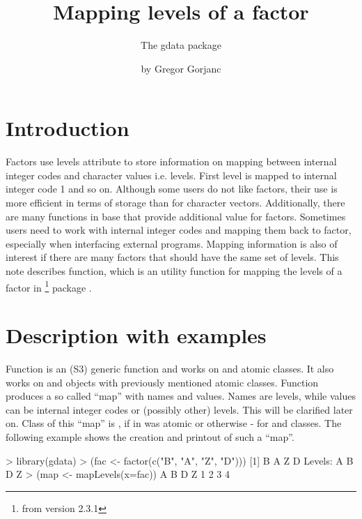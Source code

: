 \documentclass[a4paper]{report}
\begin{document}
\begin{article}

\title{Mapping levels of a factor}
\subtitle{The gdata package}
\author{by Gregor Gorjanc}

\maketitle

\section{Introduction}

Factors use levels attribute to store information on mapping between
internal integer codes and character values i.e. levels. First level is
mapped to internal integer code 1 and so on. Although some users do not
like factors, their use is more efficient in terms of storage than for
character vectors. Additionally, there are many functions in base \R{} that
provide additional value for factors. Sometimes users need to work with
internal integer codes and mapping them back to factor, especially when
interfacing external programs. Mapping information is also of interest if
there are many factors that should have the same set of levels. This note
describes  function, which is an utility function for
mapping the levels of a factor in  \footnote{from version 2.3.1}
package \citep{WarnesGdata}.

\section{Description with examples}

Function  is an (S3) generic function and works on
 and  atomic classes. It also works on
 and  objects with previously mentioned atomic
classes. Function  produces a so called ``map'' with names
and values. Names are levels, while values can be internal integer codes or
(possibly other) levels. This will be clarified later on.  Class of this
``map'' is , if  in  was atomic
or  otherwise - for  and 
classes. The following example shows the creation and printout of such a
``map''.

\begin{smallverbatim}
> library(gdata)
> (fac <- factor(c("B", "A", "Z", "D")))
[1] B A Z D
Levels: A B D Z
> (map <- mapLevels(x=fac))
A B D Z
1 2 3 4
\end{smallverbatim}


\end{article}
\end{document}
